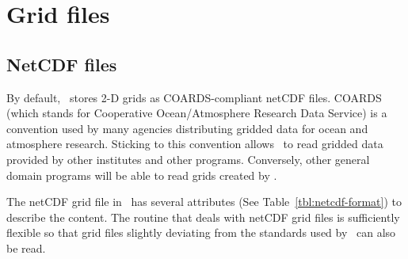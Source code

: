 \section{Grid files} 

\subsection{NetCDF files}

By default, \GMT\ stores 2-D grids as COARDS-compliant netCDF files.
COARDS (which stands for Cooperative Ocean/Atmosphere Research Data Service) is a convention used by
many agencies distributing gridded data for ocean and atmosphere research. Sticking to
this convention allows \GMT\ to read gridded data provided by other institutes
and other programs. Conversely, other general domain programs
will be able to read grids created by \GMT.

The netCDF grid file in \GMT\ has several attributes (See Table~\ref{tbl:netcdf-format})
to describe the content. The routine
that deals with netCDF grid files is sufficiently flexible so that grid files slightly deviating
from the standards used by \GMT\ can also be read.

